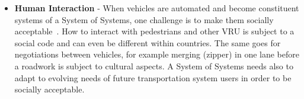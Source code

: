 \begin{itemize}
\item {\bf Human Interaction} - When vehicles are automated and become constituent systems of a System of Systems, one challenge is to make them socially acceptable~\cite{vinkhuyzen2016}. How to interact with pedestrians and other VRU is subject to a social code and can even be different within countries. The same goes for negotiations between vehicles, for example merging (zipper) in one lane before a roadwork is subject to cultural aspects. A System of Systems needs also to adapt to evolving needs of future transportation system users in order to be socially acceptable.
\end{itemize}